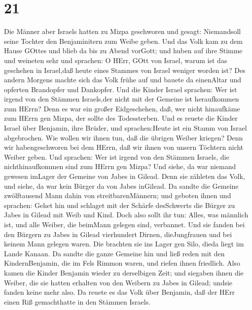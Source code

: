 \hypertarget{section-20}{%
\section{21}\label{section-20}}

 Die Männer aber Israels hatten zu Mizpa geschworen und
gesagt: Niemandsoll seine Tochter den Benjaminitern zum Weibe geben.
 Und das Volk kam zu dem Hause GOttes und blieb da bis zu
Abend vorGott; und huben auf ihre Stimme und weineten sehr 
und sprachen: O HErr, GOtt von Israel, warum ist das geschehen in
Israel,daß heute eines Stammes von Israel weniger worden ist?
 Des andern Morgens machte sich das Volk frühe auf und
bauete da einenAltar und opferten Brandopfer und Dankopfer. 
Und die Kinder Israel sprachen: Wer ist irgend von den Stämmen
Israels,der nicht mit der Gemeine ist heraufkommen zum HErrn? Denn es
war ein großer Eidgeschehen, daß, wer nicht hinaufkäme zum HErrn gen
Mizpa, der sollte des Todessterben.  Und es reuete die
Kinder Israel über Benjamin, ihre Brüder, und sprachen:Heute ist ein
Stamm von Israel abgebrochen.  Wie wollen wir ihnen tun, daß
die übrigen Weiber kriegen? Denn wir habengeschworen bei dem HErrn, daß
wir ihnen von unsern Töchtern nicht Weiber geben.  Und
sprachen: Wer ist irgend von den Stämmen Israels, die nichthinaufkommen
sind zum HErrn gen Mizpa? Und siehe, da war niemand gewesen imLager der
Gemeine von Jabes in Gilead.  Denn sie zähleten das Volk,
und siehe, da war kein Bürger da von Jabes inGilead.  Da
sandte die Gemeine zwölftausend Mann dahin von streitbarenMännern; und
geboten ihnen und sprachen: Gehet hin und schlaget mit der Schärfe
desSchwerts die Bürger zu Jabes in Gilead mit Weib und Kind.
 Doch also sollt ihr tun: Alles, was männlich ist, und alle
Weiber, die beimMann gelegen sind, verbannet.  Und sie
fanden bei den Bürgern zu Jabes in Gilead vierhundert Dirnen,
dieJungfrauen und bei keinem Mann gelegen waren. Die brachten sie ins
Lager gen Silo, dieda liegt im Lande Kanaan.  Da sandte die
ganze Gemeine hin und ließ reden mit den KindernBenjamin, die im Fels
Rimmon waren, und riefen ihnen friedlich.  Also kamen die
Kinder Benjamin wieder zu derselbigen Zeit; und siegaben ihnen die
Weiber, die sie hatten erhalten von den Weibern zu Jabes in Gilead;
undsie fanden keine mehr also.  Da reuete es das Volk über
Benjamin, daß der HErr einen Riß gemachthatte in den Stämmen Israels.
